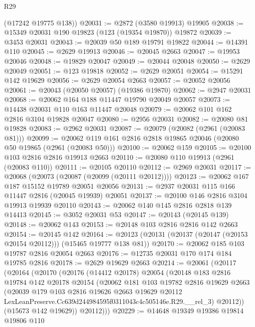 \begin{lexlean}{R29}
\begin{coremodule}
      (@17242 @19775 @138))
@20031 := @2872 (@3580 @19913) @19905
@20038 := @15349 @20031 @190 @19823 (@123 (@19354 @19870)) @19872
@20039 := @3453 @20031
@20043 := @20039 @50 @189 @19791 @19822
@20044 := @14391 @110
@20045 := @2629 @19913
@20046 := @20045 @2663
@20047 := @19953 @20046
@20048 := @19829 @20047
@20049 := @20044 @20048
@20050 := @2629 @20049
@20051 := @123 @19818
@20052 := @2629 @20051
@20054 := @15291 @142 @19629
@20056 := @2629 @20054 @2663
@20057 := @20052 @20056
@20061 := @20043 (@20050 @20057) (@19386 @19870)
@20062 := @2947 @20031
@20068 := @20062 @164 @188 @11447 @19790 @20049 @20057
@20073 := @14438 @20031 @110 @163 @11447 @20048
@20079 := @20062 @101 @162 @2816 @3104 @19828 @20047
@20080 := @2956 @20031
@20082 := @20080 @81 @19828
@20083 := @2962 @20031
@20087 := @20079 (@20082 (@2961 (@20083 @81)))
@20099 := @20062 @119 @161 @2816 @2818 @19865 @20046 (@20080 @50 @19865 (@2961 (@20083 @50)))
@20100 := @20062 @159
@20105 := @20100 @103 @2816 @2816 @19913 @2663
@20110 := @20080 @110 @19913 (@2961 (@20083 @110))
@20111 := @20105 @20110
@20112 := @2969 @20031
@20117 := @20068 (@20073 (@20087 (@20099 (@20111 @20112))))
@20123 := @20062 @167 @187 @15152 @19789 @20051 @20056
@20131 := @2937 @20031 @115 @166 @11447 @2816 (@20045 @19939) @20051
@20137 := @20100 @146 @2816 @3104 @19913 @19939 @20110
@20143 := @20062 @140 @145 @2816 @2818 @139 @14413
@20145 := @3052 @20031 @53
@20147 := @20143 (@20145 @139)
@20148 := @20062 @143
@20153 := @20148 @103 @2816 @2816 @142 @2663
@20154 := @20145 @142
@20164 := @20123 (@20131 (@20137 (@20147 (@20153 @20154 @20112))) (@15465 @19777 @138 @81))
@20170 := @20062 @185 @103 @19787 @2816 @20054 @2663
@20176 := @12735 @20031 @170 @174 @184 @19785 @2816
@20178 := @2629 @19629 @2663
@20214 := @20061
    (@20117
      (@20164
        (@20170
          (@20176
            (@14412 @20178)
            @20054
            (@20148
              @183
              @2816
              @19784
              @142
              @20178
              @20154
              (@20062
                @181
                @103
                @19782
                @2816
                @19629
                @2663
                (@20039
                  @179
                  @103
                  @2816
                  @19626
                  @2663
                  @19629
                  @20112
                  LexLeanPreserve.Cc639d244984595f0311043c4c505146e.R29.__rel_3)
                @20112))
            (@15673 @142 @19629))
          @20112)))
@20229 := @14648
    @19349
    @19386
    @19814
    @19806
    @110

\end{coremodule}
\end{lexlean}
